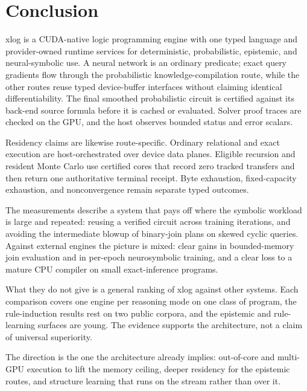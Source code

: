 \section{Conclusion}\label{sec:conclusion}

xlog is a CUDA-native logic programming engine with one typed language and
provider-owned runtime services for deterministic, probabilistic, epistemic,
and neural-symbolic use. A neural network is an ordinary predicate; exact query
gradients flow through the probabilistic knowledge-compilation route, while the
other routes reuse typed device-buffer interfaces without claiming identical
differentiability. The final smoothed probabilistic circuit is certified against
its back-end source formula before it is cached or evaluated. Solver proof traces
are checked on the GPU, and the host observes bounded status and error scalars.

Residency claims are likewise route-specific. Ordinary relational and exact
execution are host-orchestrated over device data planes. Eligible recursion and
resident Monte Carlo use certified cores that record zero tracked transfers and
then return one authoritative terminal receipt. Byte exhaustion, fixed-capacity
exhaustion, and nonconvergence remain separate typed outcomes.

The measurements describe a system that pays off where the symbolic workload
is large and repeated: reusing a verified circuit across training iterations,
and avoiding the intermediate blowup of binary-join plans on skewed cyclic
queries. Against external engines the picture is mixed: clear
gains in bounded-memory join evaluation and in per-epoch neurosymbolic
training, and a clear loss to a mature CPU compiler on small exact-inference
programs.

What they do not give is a general ranking of xlog against other systems. Each
comparison covers one engine per reasoning mode on one class of program, the
rule-induction results rest on two public corpora, and the epistemic and
rule-learning surfaces are young. The evidence supports the architecture, not
a claim of universal superiority.

The direction is the one the architecture already implies: out-of-core and
multi-GPU execution to lift the memory ceiling, deeper residency for the
epistemic routes, and structure learning that runs on the stream rather than
over it.
